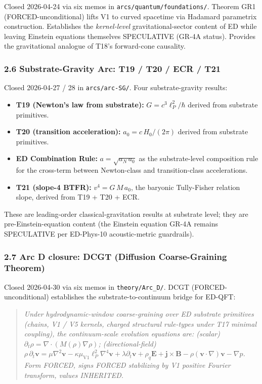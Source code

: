 \documentclass[
  11pt,a4paper]{article}
\providecommand{\tightlist}{%
  \setlength{\itemsep}{0pt}\setlength{\parskip}{0pt}}
\begin{document}
Closed 2026-04-24 via six memos in \texttt{arcs/quantum/foundations/}.
Theorem GR1 (FORCED-unconditional) lifts V1 to curved spacetime via
Hadamard parametrix construction. Establishes the \emph{kernel-level}
gravitational-sector content of ED while leaving Einstein equations
themselves SPECULATIVE (GR-4A status). Provides the gravitational
analogue of T18's forward-cone causality.

\subsubsection{2.6 Substrate-Gravity Arc: T19 / T20 / ECR /
T21}\label{substrate-gravity-arc-t19-t20-ecr-t21}

Closed 2026-04-27 / 28 in \texttt{arcs/arc-SG/}. Four substrate-gravity
results:

\begin{itemize}
\tightlist
\item
  \textbf{T19 (Newton's law from substrate):} \(G = c^3\ell_P^2/\hbar\)
  derived from substrate primitives.
\item
  \textbf{T20 (transition acceleration):} \(a_0 = c\,H_0/(2\pi)\)
  derived from substrate primitives.
\item
  \textbf{ED Combination Rule:} \(a = \sqrt{a_N\,a_0}\) as the
  substrate-level composition rule for the cross-term between
  Newton-class and transition-class accelerations.
\item
  \textbf{T21 (slope-4 BTFR):} \(v^4 = G\,M\,a_0\), the baryonic
  Tully-Fisher relation slope, derived from T19 + T20 + ECR.
\end{itemize}

These are leading-order classical-gravitation results at substrate
level; they are pre-Einstein-equation content (the Einstein equation
GR-4A remains SPECULATIVE per ED-Phys-10 acoustic-metric guardrails).

\subsubsection{2.7 Arc D closure: DCGT (Diffusion Coarse-Graining
Theorem)}\label{arc-d-closure-dcgt-diffusion-coarse-graining-theorem}

Closed 2026-04-30 via six memos in \texttt{theory/Arc\_D/}. DCGT
(FORCED-unconditional) establishes the substrate-to-continuum bridge for
ED-QFT:

\begin{quote}
\emph{Under hydrodynamic-window coarse-graining over ED substrate
primitives (chains, V1 / V5 kernels, charged structural rule-types under
T17 minimal coupling), the continuum-scale evolution equations are:
(scalar) \(\partial_t\rho = \nabla\cdot(M(\rho)\nabla\rho)\);
(directional-field)
\(\rho\,\partial_t\mathbf{v} = \mu\nabla^2\mathbf{v} - \kappa\mu_\mathrm{V1}\ell_P^2\nabla^4\mathbf{v} + \lambda\partial_t\mathbf{v} + \rho_q\mathbf{E} + \mathbf{j}\times\mathbf{B} - \rho(\mathbf{v}\cdot\nabla)\mathbf{v} - \nabla p\).
Form FORCED, signs FORCED stabilizing by V1 positive Fourier transform,
values INHERITED.}
\end{quote}
\end{document}
